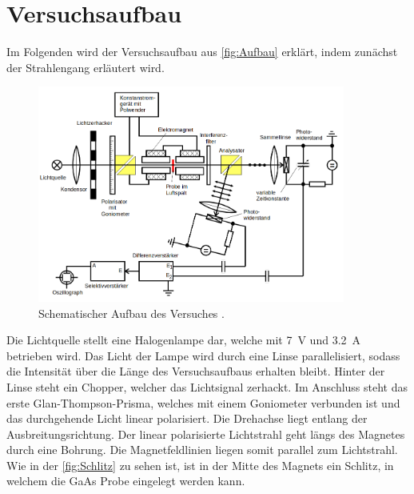 


\section{Versuchsaufbau}
Im Folgenden wird der Versuchsaufbau aus \autoref{fig:Aufbau} erklärt, indem zunächst der Strahlengang erläutert wird.\\

\begin{figure}[H]
    \includegraphics[width=0.9\textwidth]{Aufbau.png}
    \caption{Schematischer Aufbau des Versuches \cite{Versuchsanleitung_v46}.}
    \label{fig:Aufbau}
\end{figure}

\noindent Die Lichtquelle stellt eine Halogenlampe dar, welche mit \qty{7}{\volt} und \qty{3.2}{\ampere} betrieben wird.
Das Licht der Lampe wird durch eine Linse parallelisiert, sodass die Intensität über die Länge des Versuchsaufbaus erhalten bleibt. 
Hinter der Linse steht ein Chopper, welcher das Lichtsignal zerhackt. Im Anschluss steht das erste Glan-Thompson-Prisma, welches mit 
einem Goniometer verbunden ist und das durchgehende Licht linear polarisiert. Die Drehachse liegt entlang der Ausbreitungsrichtung. 
Der linear polarisierte Lichtstrahl geht längs des Magnetes durch eine Bohrung. Die Magnetfeldlinien liegen somit parallel zum 
Lichtstrahl. Wie in der \autoref{fig:Schlitz} zu sehen ist, ist in der Mitte des Magnets ein Schlitz, in welchem die GaAs Probe eingelegt 
werden kann.

